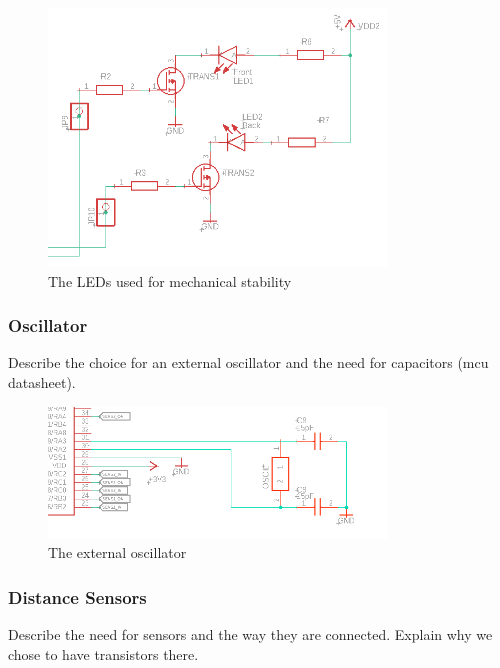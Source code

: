 \begin{figure}[htb]
    \centering
    \includegraphics[width=0.8\textwidth]{figures/hardware/LEDs.PNG}
    \caption{The LEDs used for mechanical stability}
    \label{fig:leds}
\end{figure}

\FloatBarrier


\subsubsection{Oscillator}

Describe the choice for an external oscillator and the need for capacitors (mcu datasheet).

\begin{figure}[htb]
    \centering
    \includegraphics[width=0.8\textwidth]{figures/hardware/Oscillator.PNG}
    \caption{The external oscillator}
    \label{fig:oscillator}
\end{figure}

\FloatBarrier


\subsubsection{Distance Sensors}

Describe the need for sensors and the way they are connected.
Explain why we chose to have transistors there.

